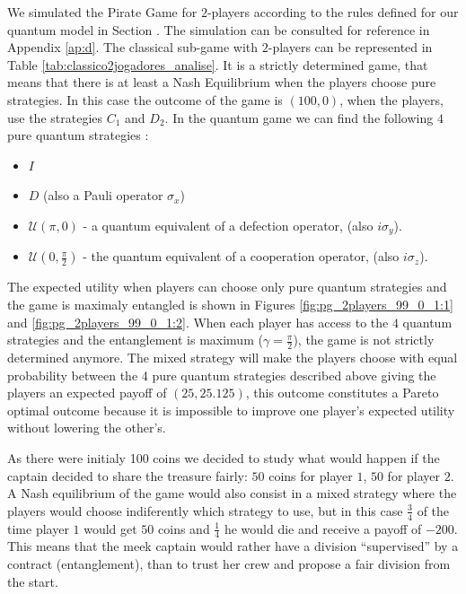 \documentclass[10pt,twocolumn]{llncs}
\begin{document}
We simulated the Pirate Game for $2$-players according to the rules defined for our quantum model in Section . The simulation can be consulted for reference in Appendix \ref{ap:d}. The classical sub-game with $2$-players can be represented in Table \ref{tab:classico2jogadores_analise}. It is a strictly determined game, that means that there is at least a Nash Equilibrium when the players choose pure strategies\cite{Leyton-Brown2008:Essentials_Game_Theory}. In this case the outcome of the game is $(100, 0)$, when the players, use the strategies $C_{1}$ and $D_{2}$.  In the quantum game we can find the following $4$ pure quantum strategies :

\begin{itemize}

\item $I$

\item $D$ (also a Pauli operator $\sigma_{x}$)

\item $\mathcal{U}( \pi, 0)$ - a quantum equivalent of a defection operator, (also $i \sigma_y$).

\item $\mathcal{U}( 0, \frac{\pi}{2})$ - the quantum equivalent of a cooperation operator, (also $i \sigma_z$).

\end{itemize}

The expected utility when players can choose only pure quantum strategies and the game is maximaly entangled is shown in Figures \ref{fig:pg_2players_99_0_1:1} and \ref{fig:pg_2players_99_0_1:2}. When each player has access to the $4$ quantum strategies and the entanglement is maximum ($\gamma=\frac{\pi}{2}$), the game is not strictly determined anymore. The mixed strategy will make the players choose with equal probability between the 4 pure quantum strategies described above giving the players an expected payoff of $(25, 25.125)$, this outcome constitutes a Pareto optimal outcome because it is impossible to improve one player's expected utility without lowering the other's. 

As there were initialy 100 coins we decided to study what would happen if the captain decided to share the treasure fairly: $50$ coins for player $1$, $50$ for player $2$. A Nash equilibrium of the game would also consist in a mixed strategy where the players would choose indiferently which strategy to use, but in this case $\frac{3}{4}$ of the time player $1$ would get $50$ coins and $\frac{1}{4}$ he would die and receive a payoff of $-200$. This means that the meek captain would rather have a division ``supervised'' by a contract (entanglement), than to trust her crew and propose a fair division from the start.
\end{document}
